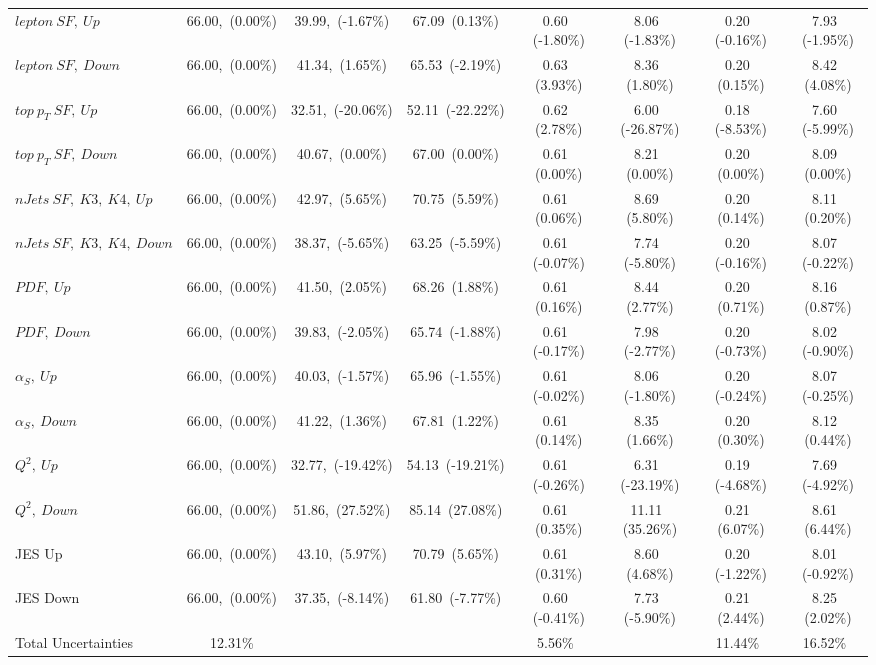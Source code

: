 \begin{table}
\begin{center}
{\begin{tabular}{|l|c|c|c|c|c|c|c|}
$lepton~SF,~Up$ & 66.00,~(0.00\%) & 39.99,~(-1.67\%) & 67.09~(0.13\%) & 0.60 ~(-1.80\%) & 8.06 ~(-1.83\%) & 0.20 ~(-0.16\%) & 7.93 ~(-1.95\%) \\  
$lepton~SF,~Down$ & 66.00,~(0.00\%) & 41.34,~(1.65\%) & 65.53~(-2.19\%) & 0.63 ~(3.93\%) & 8.36 ~(1.80\%) & 0.20 ~(0.15\%) & 8.42 ~(4.08\%) \\ \hline 
$top~p_{T}~SF,~Up$ & 66.00,~(0.00\%) & 32.51,~(-20.06\%) & 52.11~(-22.22\%) & 0.62 ~(2.78\%) & 6.00 ~(-26.87\%) & 0.18 ~(-8.53\%) & 7.60 ~(-5.99\%) \\  
$top~p_{T}~SF,~Down$ & 66.00,~(0.00\%) & 40.67,~(0.00\%) & 67.00~(0.00\%) & 0.61 ~(0.00\%) & 8.21 ~(0.00\%) & 0.20 ~(0.00\%) & 8.09 ~(0.00\%) \\ \hline 
$nJets~SF,~K3,~K4,~Up$ & 66.00,~(0.00\%) & 42.97,~(5.65\%) & 70.75~(5.59\%) & 0.61 ~(0.06\%) & 8.69 ~(5.80\%) & 0.20 ~(0.14\%) & 8.11 ~(0.20\%) \\  
$nJets~SF,~K3,~K4,~Down$ & 66.00,~(0.00\%) & 38.37,~(-5.65\%) & 63.25~(-5.59\%) & 0.61 ~(-0.07\%) & 7.74 ~(-5.80\%) & 0.20 ~(-0.16\%) & 8.07 ~(-0.22\%) \\ \hline 
$PDF,~Up$ & 66.00,~(0.00\%) & 41.50,~(2.05\%) & 68.26~(1.88\%) & 0.61 ~(0.16\%) & 8.44 ~(2.77\%) & 0.20 ~(0.71\%) & 8.16 ~(0.87\%) \\  
$PDF,~Down$ & 66.00,~(0.00\%) & 39.83,~(-2.05\%) & 65.74~(-1.88\%) & 0.61 ~(-0.17\%) & 7.98 ~(-2.77\%) & 0.20 ~(-0.73\%) & 8.02 ~(-0.90\%) \\ \hline 
$\alpha_{S},~Up$ & 66.00,~(0.00\%) & 40.03,~(-1.57\%) & 65.96~(-1.55\%) & 0.61 ~(-0.02\%) & 8.06 ~(-1.80\%) & 0.20 ~(-0.24\%) & 8.07 ~(-0.25\%) \\  
$\alpha_{S},~Down$ & 66.00,~(0.00\%) & 41.22,~(1.36\%) & 67.81~(1.22\%) & 0.61 ~(0.14\%) & 8.35 ~(1.66\%) & 0.20 ~(0.30\%) & 8.12 ~(0.44\%) \\ \hline 
$Q^{2},~Up$ & 66.00,~(0.00\%) & 32.77,~(-19.42\%) & 54.13~(-19.21\%) & 0.61 ~(-0.26\%) & 6.31 ~(-23.19\%) & 0.19 ~(-4.68\%) & 7.69 ~(-4.92\%) \\  
$Q^{2},~Down$ & 66.00,~(0.00\%) & 51.86,~(27.52\%) & 85.14~(27.08\%) & 0.61 ~(0.35\%) & 11.11 ~(35.26\%) & 0.21 ~(6.07\%) & 8.61 ~(6.44\%) \\ \hline 
JES Up & 66.00,~(0.00\%) & 43.10,~(5.97\%) & 70.79~(5.65\%) & 0.61 ~(0.31\%) & 8.60 ~(4.68\%) & 0.20 ~(-1.22\%) & 8.01 ~(-0.92\%) \\  
JES Down & 66.00,~(0.00\%) & 37.35,~(-8.14\%) & 61.80~(-7.77\%) & 0.60 ~(-0.41\%) & 7.73 ~(-5.90\%) & 0.21 ~(2.44\%) & 8.25 ~(2.02\%) \\ \hline \hline 
Total Uncertainties & 12.31\% & & & 5.56\% & & 11.44\% & 16.52\% \\ \hline 
\end{tabular} 
}
\end{center}
\end{table}


